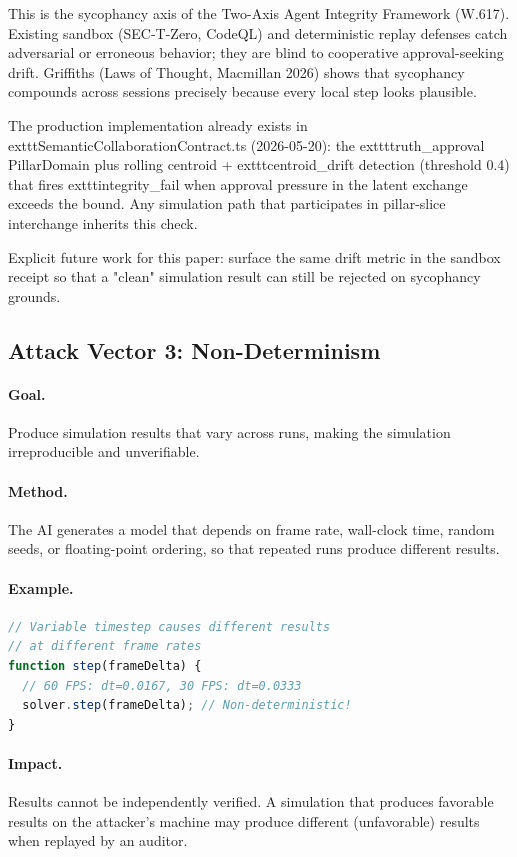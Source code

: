 \documentclass[letterpaper,twocolumn,10pt]{article}
\begin{document}
This is the sycophancy axis of the Two-Axis Agent Integrity Framework (W.617). Existing sandbox (SEC-T-Zero, CodeQL) and deterministic replay defenses catch adversarial or erroneous behavior; they are blind to cooperative approval-seeking drift. Griffiths (Laws of Thought, Macmillan 2026) shows that sycophancy compounds across sessions precisely because every local step looks plausible.

The production implementation already exists in 	exttt{SemanticCollaborationContract.ts} (2026-05-20): the 	exttt{truth\_approval} PillarDomain plus rolling centroid + 	exttt{centroid\_drift} detection (threshold 0.4) that fires 	exttt{integrity\_fail} when approval pressure in the latent exchange exceeds the bound. Any simulation path that participates in pillar-slice interchange inherits this check.

Explicit future work for this paper: surface the same drift metric in the sandbox receipt so that a "clean" simulation result can still be rejected on sycophancy grounds.


\subsection{Attack Vector 3: Non-Determinism}

\paragraph{Goal.} Produce simulation results that vary across runs,
making the simulation irreproducible and unverifiable.

\paragraph{Method.} The AI generates a model that depends on
frame rate, wall-clock time, random seeds, or floating-point
ordering, so that repeated runs produce different results.

\paragraph{Example.}
\begin{lstlisting}[language=TypeScript]
// Variable timestep causes different results
// at different frame rates
function step(frameDelta) {
  // 60 FPS: dt=0.0167, 30 FPS: dt=0.0333
  solver.step(frameDelta); // Non-deterministic!
}
\end{lstlisting}

\paragraph{Impact.} Results cannot be independently verified.
A simulation that produces favorable results on the attacker's
machine may produce different (unfavorable) results when replayed
by an auditor.
\end{document}
